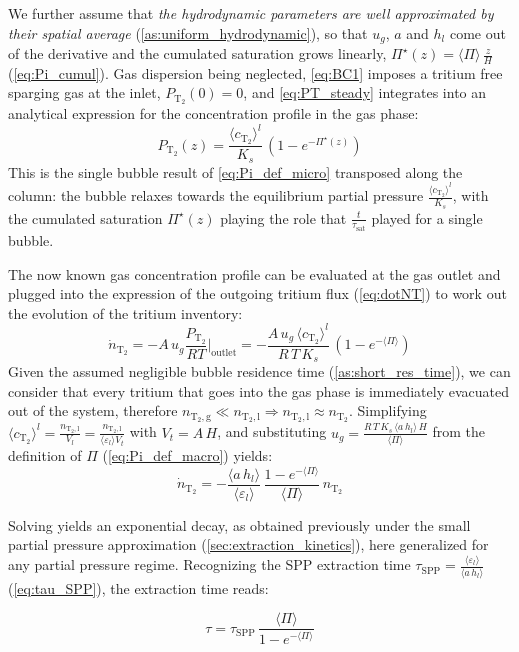 \documentclass[a4paper,11pt,oneside]{report}
\newcommand{\PT}{\ensuremath{P_\mathrm{T_2}}}
\newcommand{\CT}{\ensuremath{c_\mathrm{T_2}}}
\newcommand{\NT}{\ensuremath{n_\mathrm{T_2}}}
\newcommand{\dotNT}{\ensuremath{\dot n_\mathrm{T_2}}}
\newcommand{\NTl}{\ensuremath{n_\mathrm{T_2,l}}}
\newcommand{\NTg}{\ensuremath{n_\mathrm{T_2,g}}}
\newcounter{assumption}[chapter]
\newcommand{\assumption}[1]{\refstepcounter{assumption}\textit{#1}}
\newenvironment{keyresult}
  {\begin{tcolorbox}[colback=blue!5, colframe=blue!50!black, boxrule=0.5pt, arc=2pt]}
  {\end{tcolorbox}}
\begin{document}
We further assume that \assumption{the hydrodynamic parameters are well approximated by their spatial average\label{as:uniform_hydrodynamic}} (\cref{as:uniform_hydrodynamic}), so that $u_g$, $a$ and $h_l$ come out of the derivative and the cumulated saturation grows linearly, $\Pi^\star(z)=\langle\Pi\rangle\,\frac{z}{H}$ (\cref{eq:Pi_cumul}). Gas dispersion being neglected, \cref{eq:BC1} imposes a tritium free sparging gas at the inlet, $\PT(0)=0$, and \cref{eq:PT_steady} integrates into an analytical expression for the concentration profile in the gas phase:
\begin{equation}
\label{eq:PT_profile}
    \PT(z)=\frac{\langle \CT\rangle^l}{K_s}\,\left(1-e^{-\Pi^\star(z)}\right)
\end{equation}
This is the single bubble result of \cref{eq:Pi_def_micro} transposed along the column: the bubble relaxes towards the equilibrium partial pressure $\frac{\langle \CT\rangle^l}{K_s}$, with the cumulated saturation $\Pi^\star(z)$ playing the role that $\frac{t}{\tau_\mathrm{sat}}$ played for a single bubble.

The now known gas concentration profile can be evaluated at the gas outlet and plugged into the expression of the outgoing tritium flux (\cref{eq:dotNT}) to work out the evolution of the tritium inventory:
\begin{equation}
    \dotNT=-A\,u_g\frac{\PT}{RT}\bigg\rvert_\mathrm{outlet}=-\frac{A\,u_g\,\langle \CT\rangle^l}{R\,T\,K_s}\,\left(1-e^{-\langle\Pi\rangle}\right)
\end{equation}
Given the assumed negligible bubble residence time (\cref{as:short_res_time}), we can consider that every tritium that goes into the gas phase is immediately evacuated out of the system, therefore $\NTg\ll\NTl \Rightarrow \NTl\approx\NT$. Simplifying $\langle \CT\rangle^l=\frac{\NTl}{V_l}=\frac{\NTl}{\langle \varepsilon_l\rangle V_t}$ with $V_t=A\,H$, and substituting $u_g=\frac{R\,T\,K_s\,\langle a\,h_l\rangle\,H}{\langle\Pi\rangle}$ from the definition of $\Pi$ (\cref{eq:Pi_def_macro}) yields:
\begin{equation}
    \dotNT=-\frac{\langle a\,h_l \rangle}{\langle \varepsilon_l \rangle}\,\frac{1-e^{-\langle\Pi\rangle}}{\langle\Pi\rangle}\,\NT
\end{equation}

Solving yields an exponential decay, as obtained previously under the small partial pressure approximation (\cref{sec:extraction_kinetics}), here generalized for any partial pressure regime. Recognizing the SPP extraction time $\tau_\mathrm{SPP}=\frac{\langle \varepsilon_l \rangle}{\langle a\,h_l\rangle}$ (\cref{eq:tau_SPP}), the extraction time reads:
\begin{keyresult}
\begin{equation}
\label{eq:tau_ana}
    \tau =\tau_\mathrm{SPP}\,\frac{\langle\Pi\rangle}{1-e^{-\langle\Pi\rangle}}
\end{equation}
\end{keyresult}
\end{document}

